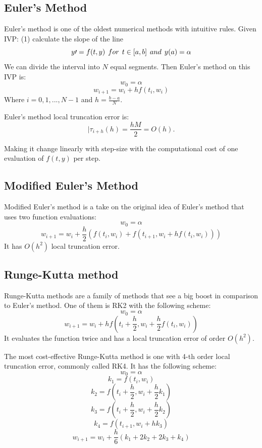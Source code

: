 \documentclass[11pt]{article}	%
\begin{document}
\subsection{Euler's Method}
Euler's method is one of the oldest numerical methods with intuitive rules. Given IVP:
(1) calculate the slope of the line 
$$y\prime = f(t, y) \hspace{0.15cm} for \hspace{0.15cm} t \in [a, b] \hspace{0.15cm} and \hspace{0.15cm} y(a) = \alpha $$ 
We can divide the interval into $N$ equal segments. Then Euler's method on this IVP is: 
$$w_0 = \alpha $$
$$w_{i+1} = w_i + hf(t_i, w_i)$$
Where $i = 0,1,..., N-1$ and $h = \frac{b-a}{N}$. 

Euler's method local truncation error is: 
$$|\tau _{i+h}(h) = \frac{hM}{2} = O(h).$$

Making it change linearly with step-size with the computational cost of one evaluation of $f(t, y)$ per step. 

\subsection{Modified Euler's Method}
Modified Euler's method is a take on the original idea of Euler's method that uses two function evaluations:
$$w_0 = \alpha $$
$$w_{i+1} = w_i + \frac{h}{2}(f(t_i,w_i) + f(t_{i+1}, w_i + hf(t_i,w_i)))$$
It has $O(h^2)$ local truncation error. 


\subsection{Runge-Kutta method}
Runge-Kutta methods are a family of methods that see a big boost in comparison to Euler's method. One of them is RK2 with the following scheme:
$$w_0 = \alpha $$
$$w_{i+1} = w_i + hf(t_i + \frac{h}{2}, w_i + \frac{h}{2}f(t_i, w_i))$$
It evaluates the function twice and has a local truncation error of order $O(h^2)$.

The most cost-effective Runge-Kutta method is one with 4-th order local truncation error, commonly called RK4. It has the following scheme:
$$w_0 = \alpha $$
$$k_1 = f(t_i, w_i)$$
$$k_2 = f(t_i + \frac{h}{2}, w_i + \frac{h}{2}k_1)$$
$$k_3 = f(t_i + \frac{h}{2}, w_i + \frac{h}{2}k_2)$$
$$k_4 = f(t_{i+1}, w_i + hk_3)$$
$$w_{i+1} = w_i + \frac{h}{6}(k_1 + 2k_2 + 2k_3 + k_4)$$
\end{document}
